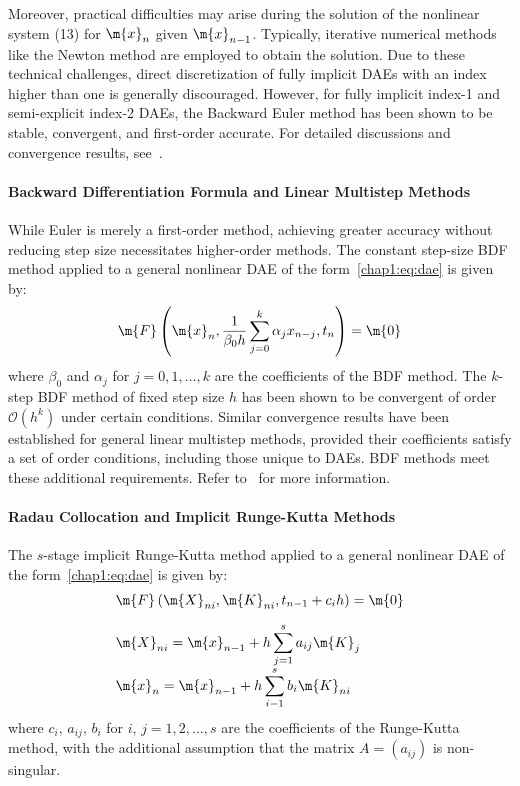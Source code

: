 Moreover, practical difficulties may arise during the solution of the nonlinear system (13) for $\m{x}_n$ given $\m{x}_{n-1}$. Typically, iterative numerical methods like the Newton method are employed to obtain the solution. Due to these technical challenges, direct discretization of fully implicit \acp{DAE} with an index higher than one is generally discouraged. However, for fully implicit index-1 and semi-explicit index-2 \acp{DAE}, the Backward Euler method has been shown to be stable, convergent, and first-order accurate. For detailed discussions and convergence results, see~\cite{brenan1995numerical, hairer1999stiff}.

\paragraph{Backward Differentiation Formula and Linear Multistep Methods}

While Euler is merely a first-order method, achieving greater accuracy without reducing step size necessitates higher-order methods. The constant step-size \ac{BDF} method applied to a general nonlinear \ac{DAE} of the form~\eqref{chap1:eq:dae} is given by:
%
\begin{equation*}
  \m{F}\left(\m{x}_n, \dfrac{1}{\beta_0 h} \sum_{j=0}^{k} \alpha_j x_{n-j}, t_n\right) = \m{0}
\end{equation*}
%
where $\beta_0$ and $\alpha_j$ for $j = 0, 1, \dots, k$ are the coefficients of the \ac{BDF} method. The $k$-step \ac{BDF} method of fixed step size $h$ has been shown to be convergent of order $\mathcal{O}(h^k)$ under certain conditions. Similar convergence results have been established for general linear multistep methods, provided their coefficients satisfy a set of order conditions, including those unique to \acp{DAE}. \ac{BDF} methods meet these additional requirements. Refer to~\cite{brenan1995numerical} for more information.

\paragraph{Radau Collocation and Implicit Runge-Kutta Methods}

The $s$-stage implicit Runge-Kutta method applied to a general nonlinear \ac{DAE} of the form~\eqref{chap1:eq:dae} is given by:
%
\begin{equation*}
  \begin{array}{l}
      \m{F}\left(\m{X}_{ni}, \m{K}_{ni}, t_{n-1}+c_i h\right) = \m{0} \\[1.0em]
      \m{X}_{ni} = \m{x}_{n-1} + h\displaystyle\sum_{j=1}^s a_{ij}\m{K}_j \\[0.25em]
      \m{x}_n = \m{x}_{n-1} + h\displaystyle\sum_{i-1}^s b_i \m{K}_{ni}
  \end{array}
\end{equation*}
%
where $c_i$, $a_{ij}$, $b_i$ for $i$, $j = 1, 2, \dots, s$ are the coefficients of the Runge-Kutta method, with the additional assumption that the matrix $A = (a_{ij})$ is non-singular.

